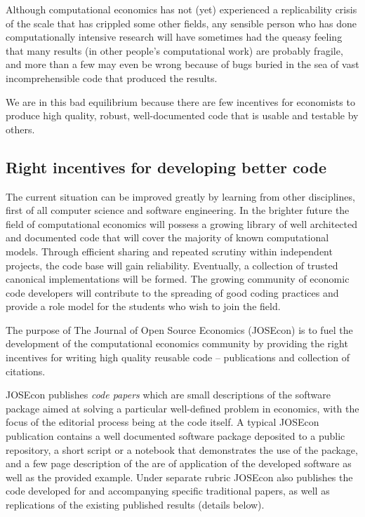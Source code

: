 Although computational economics has not (yet) experienced a replicability
crisis of the scale that has crippled some other fields, any sensible person
who has done computationally intensive research will have sometimes had the
queasy feeling that many results (in other people's computational work) are
probably fragile, and more than a few may even be wrong because of bugs buried
in the sea of vast incomprehensible code that produced the results.

We are in this bad equilibrium because there are few incentives for economists
to produce high quality, robust, well-documented code that is usable and
testable by others.


\subsection{Right incentives for developing better code}

The current situation can be improved greatly by learning from other disciplines,
first of all computer science and software engineering.
In the brighter future the field of computational economics will possess a growing library 
of well architected and documented code that will cover the majority of known 
computational models.
Through efficient sharing and repeated scrutiny within independent projects,
the code base will gain reliability. Eventually, a collection of trusted canonical
implementations will be formed.
The growing community of economic code developers will contribute to the spreading 
of good coding practices and provide a role model for the students who wish to join the field.


The purpose of The Journal of Open Source Economics (JOSEcon) is to fuel the 
development of the computational economics community by providing the right incentives
for writing high quality reusable code -- publications and collection of citations.

JOSEcon publishes \emph{code papers} which are small descriptions of the software package
aimed at solving a particular well-defined problem in economics, with the focus
of the editorial process being at the code itself.
A typical JOSEcon publication contains a well documented software package deposited to
a public repository, a short script or a notebook that demonstrates the use of the 
package, and a few page description of the are of application of the developed software
as well as the provided example.
Under separate rubric JOSEcon also publishes the code developed for and accompanying 
specific traditional papers, as well as replications of the existing published results 
(details below).

